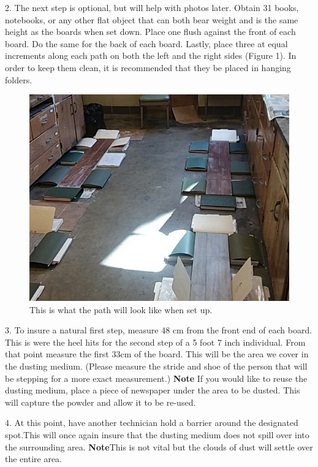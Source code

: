 2. The next step is optional, but will help with photos later. Obtain 31 books, notebooks, or any other flat object that can both bear weight and is the same height as the boards when set down. Place one flush against the front of each board. Do the same for the back of each board. Lastly, place three at equal increments along each path on both the left and the right sides (Figure 1). In order to keep them clean, it is recommended that they be placed in hanging folders.

\begin{figure}[!htp]
\centering
\includegraphics[scale=.2]{Path2}
\caption{This is what the path will look like when set up.}
\label{Figure 1}
\end{figure}

3. To insure a natural first step, measure 48 cm from the front end of each board. This is were the heel hits for the second step of a 5 foot 7 inch individual. From that point measure the first 33cm of the board. This will be the area we cover in the dusting medium. (Please measure the stride and shoe of the person that will be stepping for a more exact measurement.) \textbf{Note} If you would like to reuse the dusting medium, place a piece of newspaper under the area to be dusted. This will capture the powder and allow it to be re-used.

4. At this point, have another technician hold a barrier around the designated spot.This will once again insure that the dusting medium does not spill over into the surrounding area. \textbf{Note}This is not vital but the clouds of dust will settle over the entire area.


